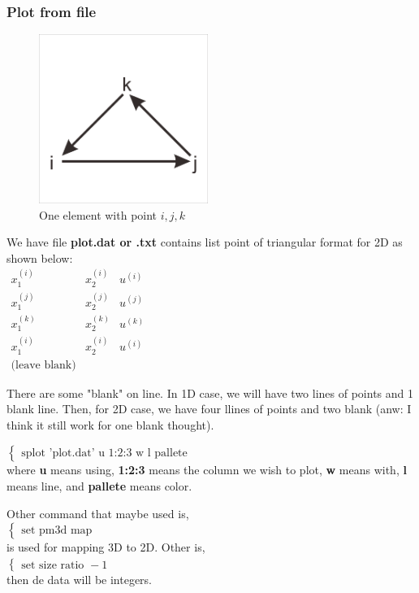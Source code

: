 \documentclass[a4paper,10pt]{article}
\begin{document}
\subsubsection{Plot from file}
\begin{figure}
	\includegraphics[width=5.5cm]{"picture/triangular format"}
	\caption{One element with point $ i,j,k $}
	\label{fig:triangular-format}
\end{figure}

We have file \textbf{plot.dat or .txt} contains list point of triangular format for 2D as shown below:\\
$ \begin{matrix}
	x^{(i)}_{1} & x^{(i)}_{2} & u^{(i)} \\
	x^{(j)}_{1} & x^{(j)}_{2} & u^{(j)} \\
	x^{(k)}_{1} & x^{(k)}_{2} & u^{(k)} \\
	x^{(i)}_{1} & x^{(i)}_{2} & u^{(i)} \\
	\text{(leave blank)}
\end{matrix} $

There are some "blank" on line. In 1D case, we will have two lines of points and 1 blank line. Then, for 2D case, we have four llines of points and two blank (anw: I think it still work for one blank thought).

$ \begin{cases}
\text{splot 'plot.dat' u 1:2:3 w l pallete}
\end{cases} $ \\
where \textbf{u} means using, \textbf{1:2:3} means the column we wish to plot, \textbf{w} means with, \textbf{l} means line, and \textbf{pallete} means color.

Other command that maybe used is,\\
$ \begin{cases}
\text{set pm3d map}
\end{cases} $\\
is used for mapping 3D to 2D. Other is,\\
$ \begin{cases}
\text{set size ratio } -1
\end{cases} $\\
then de data will be integers.
\end{document}
